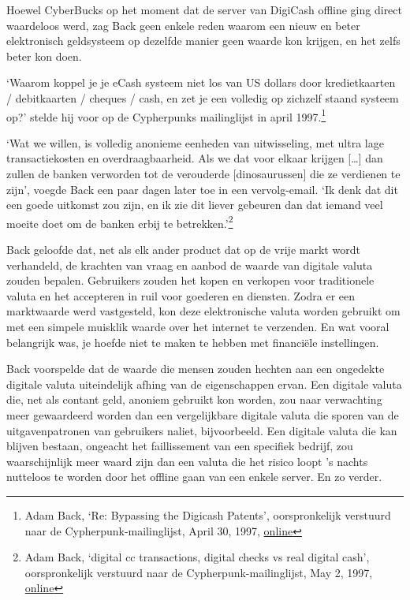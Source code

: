 \documentclass[smalldemyvopaper,11pt,twoside,onecolumn,openright,extrafontsizes,hidelinks]{memoir}
\begin{document}
Hoewel CyberBucks op het moment dat de server van DigiCash offline ging
direct waardeloos werd, zag Back geen enkele reden waarom een nieuw en
beter elektronisch geldsysteem op dezelfde manier geen waarde kon
krijgen, en het zelfs beter kon doen.

`Waarom koppel je je eCash systeem niet los van US dollars door
kredietkaarten / debitkaarten / cheques / cash, en zet je een volledig
op zichzelf staand systeem op?' stelde hij voor op de Cypherpunks
mailinglijst in april 1997.\footnote{Adam Back, `Re: Bypassing the
  Digicash Patents', oorspronkelijk verstuurd naar de
  Cypherpunk-mailinglijst, April 30, 1997,
  \href{https://cypherpunks.venona.com/date/1997/04/msg00822.html}{online}}

`Wat we willen, is volledig anonieme eenheden van uitwisseling, met
ultra lage transactiekosten en overdraagbaarheid. Als we dat voor elkaar
krijgen {[}\ldots{]} dan zullen de banken verworden tot de verouderde
{[}dinosaurussen{]} die ze verdienen te zijn', voegde Back een paar
dagen later toe in een vervolg-email. `Ik denk dat dit een goede
uitkomst zou zijn, en ik zie dit liever gebeuren dan dat iemand veel
moeite doet om de banken erbij te betrekken.'\footnote{Adam Back,
  `digital cc transactions, digital checks vs real digital cash',
  oorspronkelijk verstuurd naar de Cypherpunk-mailinglijst, May 2, 1997,
  \href{https://cypherpunks.venona.com/date/1997/05/msg00104.html}{online}}

Back geloofde dat, net als elk ander product dat op de vrije markt wordt
verhandeld, de krachten van vraag en aanbod de waarde van digitale
valuta zouden bepalen. Gebruikers zouden het kopen en verkopen voor
traditionele valuta en het accepteren in ruil voor goederen en diensten.
Zodra er een marktwaarde werd vastgesteld, kon deze elektronische valuta
worden gebruikt om met een simpele muisklik waarde over het internet te
verzenden. En wat vooral belangrijk was, je hoefde niet te maken te
hebben met financiële instellingen.

Back voorspelde dat de waarde die mensen zouden hechten aan een
ongedekte digitale valuta uiteindelijk afhing van de eigenschappen
ervan. Een digitale valuta die, net als contant geld, anoniem gebruikt
kon worden, zou naar verwachting meer gewaardeerd worden dan een
vergelijkbare digitale valuta die sporen van de uitgavenpatronen van
gebruikers naliet, bijvoorbeeld. Een digitale valuta die kan blijven
bestaan, ongeacht het faillissement van een specifiek bedrijf, zou
waarschijnlijk meer waard zijn dan een valuta die het risico loopt 's
nachts nutteloos te worden door het offline gaan van een enkele server.
En zo verder.
\end{document}

